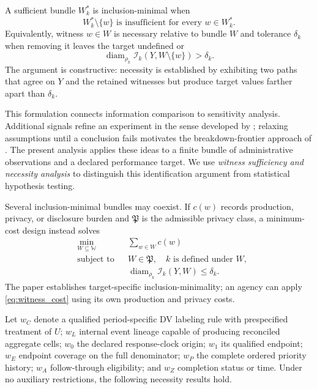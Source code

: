 \documentclass[11pt]{article}
\begin{document}
A sufficient bundle $W_k^*$ is inclusion-minimal when
\begin{equation}
W_k^*\setminus\{w\}
\text{ is insufficient for every }w\in W_k^*.
\label{eq:inclusion_minimality}
\end{equation}
Equivalently, witness $w\in W$ is necessary relative to bundle $W$ and tolerance $\delta_k$ when removing it leaves the target undefined or
\begin{equation}
\operatorname{diam}_{\rho_k}\mathcal I_k(Y,W\setminus\{w\})>\delta_k.
\label{eq:witness_necessity}
\end{equation}
The argument is constructive: necessity is established by exhibiting two paths that agree on $Y$ and the retained witnesses but produce target values farther apart than $\delta_k$.

This formulation connects information comparison to sensitivity analysis. Additional signals refine an experiment in the sense developed by \citet{Blackwell1953}; relaxing assumptions until a conclusion fails motivates the breakdown-frontier approach of \citet{MastenPoirier2020}. The present analysis applies these ideas to a finite bundle of administrative observations and a declared performance target. We use \emph{witness sufficiency and necessity analysis} to distinguish this identification argument from statistical hypothesis testing.

Several inclusion-minimal bundles may coexist. If $c(w)$ records production, privacy, or disclosure burden and $\mathfrak P$ is the admissible privacy class, a minimum-cost design instead solves
\begin{equation}
\begin{aligned}
&\min_{W\subseteq\mathbb W} && \sum_{w\in W}c(w) \\
&\text{subject to} && W\in\mathfrak P,\quad k\text{ is defined under }W, \\
&&& \operatorname{diam}_{\rho_k}\mathcal I_k(Y,W)\le\delta_k.
\end{aligned}
\label{eq:witness_cost}
\end{equation}
The paper establishes target-specific inclusion-minimality; an agency can apply \cref{eq:witness_cost} using its own production and privacy costs.

Let $w_C$ denote a qualified period-specific DV labeling rule with prespecified treatment of $U$; $w_L$ internal event lineage capable of producing reconciled aggregate cells; $w_0$ the declared response-clock origin; $w_1$ its qualified endpoint; $w_E$ endpoint coverage on the full denominator; $w_P$ the complete ordered priority history; $w_A$ follow-through eligibility; and $w_Z$ completion status or time. Under no auxiliary restrictions, the following necessity results hold.
\end{document}
